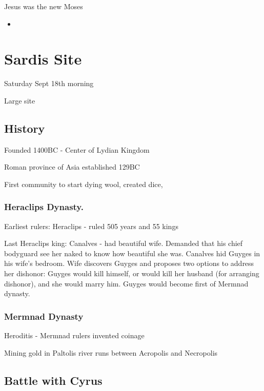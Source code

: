 \documentclass[
]{book}
\providecommand{\tightlist}{%
  \setlength{\itemsep}{0pt}\setlength{\parskip}{0pt}}
\begin{document}
Jesus was the new Moses

\begin{itemize}
\tightlist
\item
\end{itemize}

\hypertarget{sardis-site}{%
\chapter{Sardis Site}\label{sardis-site}}

Saturday Sept 18th morning

Large site

\hypertarget{history-3}{%
\section{History}\label{history-3}}

Founded 1400BC - Center of Lydian Kingdom

Roman province of Asia established 129BC

First community to start dying wool, created dice,

\hypertarget{heraclips-dynasty.}{%
\subsection{Heraclips Dynasty.}\label{heraclips-dynasty.}}

Earliest rulers: Heraclips - ruled 505 years and 55 kings

Last Heraclips king: Canalves - had beautiful wife. Demanded that his chief bodyguard see her naked to know how beautiful she was. Canalves hid Guyges in his wife's bedroom. Wife discovers Guyges and proposes two options to address her dishonor: Guyges would kill himself, or would kill her husband (for arranging dishonor), and she would marry him. Guyges would become first of Mermnad dynasty.

\hypertarget{mermnad-dynasty}{%
\subsection{Mermnad Dynasty}\label{mermnad-dynasty}}

Heroditis - Mermnad rulers invented coinage

Mining gold in Paltolis river runs between Acropolis and Necropolis

\hypertarget{battle-with-cyrus}{%
\section{Battle with Cyrus}\label{battle-with-cyrus}}
\end{document}
